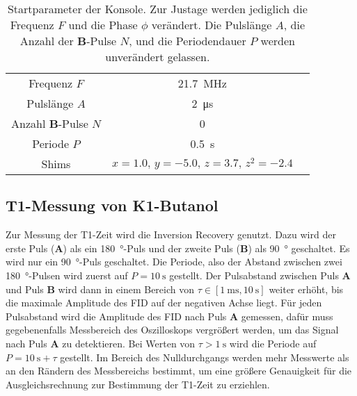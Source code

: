 \begin{table}[H]
  \centering
  \caption{Startparameter der Konsole. Zur Justage werden jediglich die Frequenz $F$ und die Phase $\phi$ verändert. Die Pulslänge $A$, die Anzahl der \textbf{B}-Pulse $N$, und die Periodendauer $P$ werden unverändert gelassen.}
  \label{tab:Startparameter}
  \begin{tabular}{ccc}
    \toprule
    Frequenz $F$ & \SI{21.7}{\mega\hertz} \\
    Pulslänge $A$ & \SI{2}{\micro\second} \\
    Anzahl \textbf{B}-Pulse $N$ & 0 \\
    Periode $P$ & \SI{0.5}{\second} \\
    Shims & $x = \num{1.0}, \,  y = \num{-5.0}, \, z = \num{3.7}, \, z^2 = \num{-2.4}$ \\
    \bottomrule
  \end{tabular}
\end{table}


\subsection{T1-Messung von K1-Butanol}
Zur Messung der T1-Zeit wird die Inversion Recovery genutzt.
Dazu wird der erste Puls (\textbf{A}) als ein \SI{180}{\degree}-Puls und der zweite Puls (\textbf{B}) als \SI{90}{\degree} geschaltet.
Es wird nur ein \SI{90}{\degree}-Puls geschaltet.
Die Periode, also der Abstand zwischen zwei \SI{180}{\degree}-Pulsen wird zuerst auf $P=\SI{10}{\second}$ gestellt.
Der Pulsabstand \tau zwischen Puls \textbf{A} und Puls \textbf{B} wird dann in einem Bereich von $\tau \in [\SI{1}{\milli\second}, \SI{10}{\second}]$ weiter erhöht, bis die maximale Amplitude des FID auf der negativen Achse liegt.
Für jeden Pulsabstand wird die Amplitude des FID nach Puls \textbf{A} gemessen, dafür muss gegebenenfalls Messbereich des Oszilloskops vergrößert werden, um das Signal nach Puls \textbf{A} zu detektieren.
Bei Werten von $\tau > \SI{1}{\second}$ wird die Periode auf $ P =\SI{10}{\second} + \tau$ gestellt.
Im Bereich des Nulldurchgangs werden mehr Messwerte als an den Rändern des Messbereichs bestimmt, um eine größere Genauigkeit für die Ausgleichsrechnung zur Bestimmung der T1-Zeit zu erziehlen.



